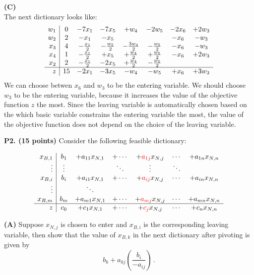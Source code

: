 \documentclass[11pt]{article}
\newcommand\red[1]{\textcolor{red}{#1}}
\begin{document}
\noindent\textbf{(C)}\\
The next dictionary looks like:
\[ \begin{array}{r| c c c c c c c}
w_1 & 0 &- 7x_1 &- 7x_5 &+ w_4 &- 2w_5 &- 2x_6 &+ 2w_3\\
w_2 & 2 & -x_1 & -x_5 & & & -x_6 & -w_3 \\
x_3 & 4 & -\frac{x_1}{2} & -\frac{w_5}{2} & -\frac{3w_4}{2} & -\frac{w_5}{2} & -x_6 & -w_3 \\
x_4 & 1 & -\frac{x_1}{2} & +x_5 & +\frac{w_4}{2} & +\frac{w_5}{2} & -x_6 & +2w_3 \\
x_2 & 2 & -\frac{x_1}{2} & -2x_5 & +\frac{w_4}{2} & -\frac{w_5}{2} && \\
\hline
z & 15 & -2x_1 & -3x_5 & -w_4 & -w_5 & +x_6 & +3w_3 \\
\end{array}\]
We can choose betwen $x_6$ and $w_3$ to be the entering variable.  We should choose $w_3$ to be the entering variable, because it increases the value of the objective function $z$ the most.  Since the leaving variable is automatically chosen based on the which basic variable constrains the entering variable the most, the value of the objective function does not depend on the choice of the leaving variable.

\medskip


\noindent\textbf{P2. (15 points)}  Consider the following feasible dictionary:

\[\begin{array}{r|c c c c c c c c}
x_{B,1} & b_1 & + a_{11} x_{N,1} & + \cdots & + \red{a_{1j}} x_{N,j} & \cdots & + a_{1n} x_{N,n}\\
\vdots & \vdots &  & \ddots & \vdots & \ddots  \\
x_{B,i} & b_i & +a_{i1} x_{N,1} & + \cdots & +\red{ a_{ij}} x_{N,j} & \cdots
                                                                & + a_{in} x_{N,n} \\
\vdots & & \ddots & \\ 
x_{B,m} & b_m & + a_{m1} x_{N,1} & + \cdots & +\red{ a_{mj} } x_{N,j} &
                                                                 \cdots  & + a_{mn} x_{N,n} \\
\hline
z & c_0 & + c_1 x_{N,1} & + \cdots & + \red{c_j} x_{N,j} & \cdots & + c_n x_{N,n}\\
\end{array}\]

\noindent \textbf{(A)} Suppose $x_{N,j}$ is chosen to enter and
$x_{B,i}$ is the corresponding leaving variable, then show that the
value of $x_{B,k}$ in the next dictionary after pivoting is given by
\[ b_k + a_{kj} \left(\frac{b_i}{ - a_{ij}}\right)  \,.\]
\end{document}
